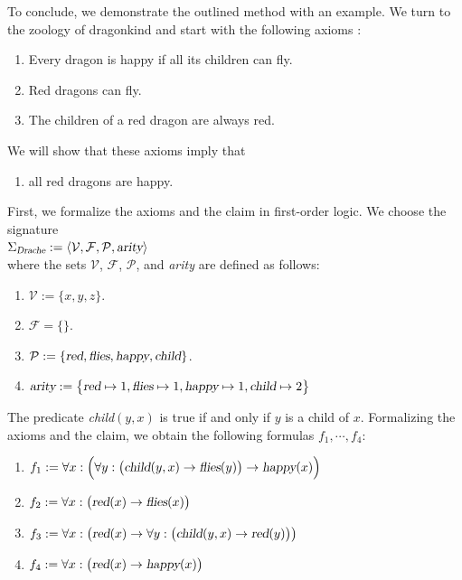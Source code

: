 \exampleEng
To conclude, we demonstrate the outlined method with an example.  We turn to the zoology of dragonkind and
start with the following axioms \cite{schoening:2008}:
\begin{enumerate}
\item Every dragon is happy if all its children can fly.
\item Red dragons can fly.
\item The children of a red dragon are always red.
\end{enumerate}
We will show that these axioms imply that
\begin{enumerate}
\item[4.] all red dragons are happy.
\end{enumerate}
First, we formalize the axioms and the claim in first-order logic.
We choose the signature \\[0.2cm]
\hspace*{1.3cm}
$\Sigma_\textsl{Drache} := \langle \mathcal{V}, \mathcal{F}, \mathcal{P}, \textsl{arity} \rangle$ 
\\[0.2cm]
where the sets $\mathcal{V}$, $\mathcal{F}$, $\mathcal{P}$, and \textsl{arity} are defined as follows:
\begin{enumerate}
\item $\mathcal{V} := \{x,y,z\}$.
\item $\mathcal{F} = \{\}$.
\item $\mathcal{P} := \{ \textsl{red}, \textsl{flies}, \textsl{happy}, \textsl{child} \}$.
\item $\textsl{arity} := \bigl\{ \textsl{red} \mapsto 1, \textsl{flies} \mapsto 1,
         \textsl{happy} \mapsto 1, \textsl{child} \mapsto 2\bigr\}$
\end{enumerate}
The predicate \textsl{child}$(y,x)$ is true if and only if $y$ is a child of $x$.
Formalizing the axioms and the claim, we obtain the following
formulas $f_1, \cdots, f_4$:
\begin{enumerate}
\item $f_1 := \forall x: \Bigl(\forall y: \big(\textsl{child}(y,x) \rightarrow \textsl{flies}(y)\big) \rightarrow \textsl{happy}(x)\Bigr)$
\item $f_2 := \forall x: \bigl(\textsl{red}(x) \rightarrow \textsl{flies}(x)\bigr)$
\item $f_3 := \forall x: \bigl(\textsl{red}(x) \rightarrow \forall y:\bigl( \textsl{child}(y,x) \rightarrow \textsl{red}(y)\bigr)\bigr)$
\item $f_4 := \forall x: \bigl(\textsl{red}(x) \rightarrow \textsl{happy}(x)\bigr)$
\end{enumerate}
